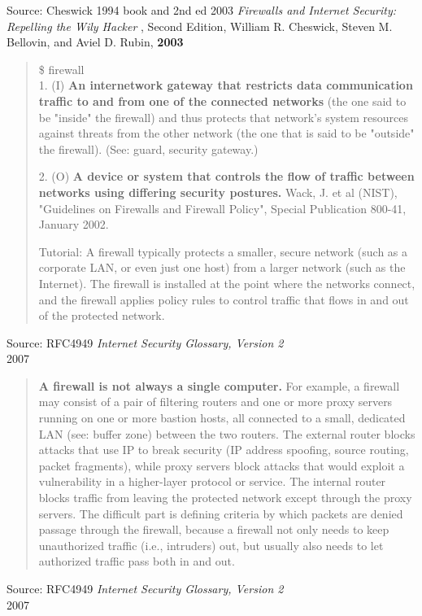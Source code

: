 \documentclass[Screen16to9,17pt]{foils}
\begin{document}
Source: Cheswick 1994 book and 2nd ed 2003
\emph{Firewalls and Internet Security: Repelling the Wily Hacker} , Second Edition, William R. Cheswick, Steven M. Bellovin, and Aviel D. Rubin, {\bf 2003}





\begin{quote}\small
\$ firewall\\

1. (I) {\bf An internetwork gateway that restricts data communication traffic to and from one of the connected networks} (the one said to be "inside" the firewall) and thus protects that network's system resources against threats from the other network (the one that is said to be "outside" the firewall). (See: guard, security gateway.)

2. (O) {\bf A device or system that controls the flow of traffic between networks using differing security postures.} Wack, J. et al (NIST), "Guidelines on Firewalls and Firewall Policy", Special Publication 800-41, January 2002.

Tutorial: A firewall typically protects a smaller, secure network (such as a corporate LAN, or even just one host) from a larger network (such as the Internet). The firewall is installed at the point where the networks connect, and the firewall applies policy rules to control traffic that flows in and out of the protected network.
\end{quote}
{\footnotesize Source: RFC4949 \emph{Internet Security Glossary, Version 2}\\
 2007}

\begin{quote}\small
{\bf A firewall is not always a single computer.} For example, a firewall may consist of a pair of filtering routers and one or more proxy servers running on one or more bastion hosts, all connected to a small, dedicated LAN (see: buffer zone) between the two routers. The external router blocks attacks that use IP to break security (IP address spoofing, source routing, packet fragments), while proxy servers block attacks that would exploit a vulnerability in a higher-layer protocol or service. The internal router blocks traffic from leaving the protected network except through the proxy servers. The difficult part is defining criteria by which packets are denied passage through the firewall, because a firewall not only needs to keep unauthorized traffic (i.e., intruders) out, but usually also needs to let authorized traffic pass both in and out.
\end{quote}
{\footnotesize Source: RFC4949 \emph{Internet Security Glossary, Version 2}\\
 2007}
\end{document}
